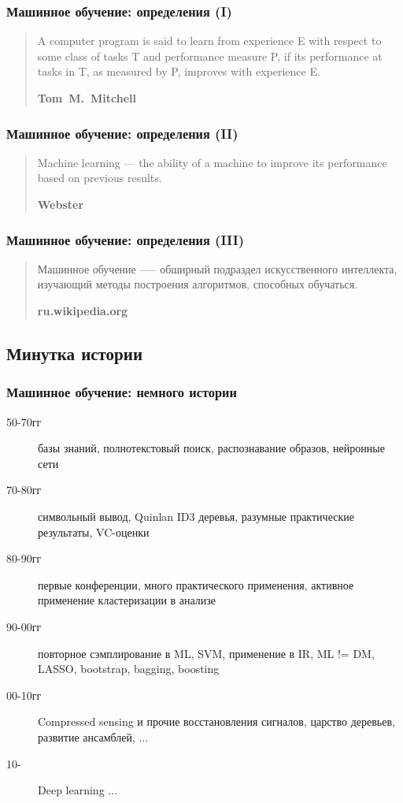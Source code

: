 \documentclass[14pt, fleqn, xcolor={dvipsnames, table}]{beamer}
\begin{document}
\begin{frame}
\frametitle{Машинное обучение: определения (I)}
\begin{quote}
A computer program is said to learn from experience E with respect to some class of tasks T and performance measure P, if its performance at tasks in T, as measured by P, improves with experience E.
\begin{flushright}\textbf{Tom~M.~Mitchell}\end{flushright}
\end{quote}
\end{frame}

\begin{frame}
\frametitle{Машинное обучение: определения (II)}
\begin{quote}
Machine learning --- the ability of a machine to improve its performance based on previous results.
\begin{flushright}\textbf{Webster}\end{flushright}
\end{quote}
\end{frame}

\begin{frame}
\frametitle{Машинное обучение: определения (III)}
\begin{quote}
Машинное обучение —-- обширный подраздел искусственного интеллекта, изучающий методы построения алгоритмов, способных обучаться.
\begin{flushright}\textbf{ru.wikipedia.org}\end{flushright}
\end{quote}
\end{frame}


\subsection{Минутка истории}
\begin{frame}
\frametitle{Машинное обучение: немного истории}
\begin{small}
\begin{description}
	\item[50-70гг] базы знаний, полнотекстовый поиск, распознавание образов, нейронные сети
	\item[70-80гг] символьный вывод, Quinlan ID3 деревья, разумные практические результаты, VC-оценки
	\item[80-90гг] первые конференции, много практического применения, активное применение кластеризации в анализе
	\item[90-00гг] повторное сэмплирование в ML, SVM, применение в IR, ML != DM, LASSO, bootstrap, bagging, boosting
	\item[00-10гг] Compressed sensing и прочие восстановления сигналов, царство деревьев, развитие ансамблей, $\ldots$
	\item[10-] Deep learning $\ldots$
\end{description}
\end{small}
\end{frame}
\end{document}
